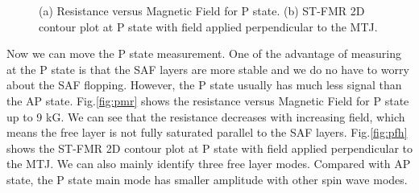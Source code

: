 \begin{figure}[!ht]
\centering
{}
\caption{(a) Resistance versus Magnetic Field for P state. (b) ST-FMR 2D contour plot at P state with field applied perpendicular to the MTJ.}
\end{figure}

Now we can move the P state measurement. One of the advantage of measuring at the P state is that the SAF layers are more stable and we do no have to worry about the SAF flopping. However, the P state usually has much less signal than the AP state. Fig.\ref{fig:pmr} shows the resistance versus Magnetic Field for P state up to 9 kG. We can see that the resistance decreases with increasing field, which means the free layer is not fully saturated parallel to the SAF layers. Fig.\ref{fig:pfh} shows the ST-FMR 2D contour plot at P state with field applied perpendicular to the MTJ. We can also mainly identify three free layer modes. Compared with AP state, the P state main mode has smaller amplitude with other spin wave modes. 


